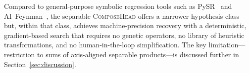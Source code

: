 Compared to general-purpose symbolic regression tools such as
PySR~\citep{cranmer2023} and AI~Feynman~\citep{udrescu2020}, the separable
\textsc{ComposeHead} offers a narrower hypothesis class but, within that class,
achieves machine-precision recovery with a deterministic, gradient-based search
that requires no genetic operators, no library of heuristic transformations, and
no human-in-the-loop simplification.  The key limitation---restriction to sums
of axis-aligned separable products---is discussed further in
Section~\ref{sec:discussion}.
